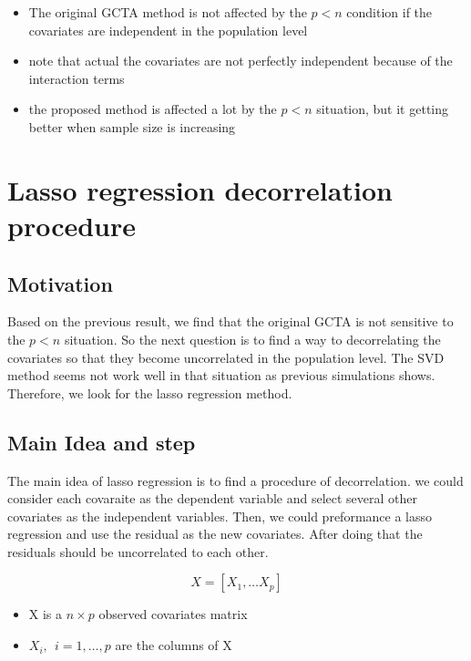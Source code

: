 \documentclass[]{article}
\providecommand{\tightlist}{%
  \setlength{\itemsep}{0pt}\setlength{\parskip}{0pt}}
\begin{document}
\begin{itemize}
\tightlist
\item
  The original GCTA method is not affected by the \(p < n\) condition if
  the covariates are independent in the population level
\item
  note that actual the covariates are not perfectly independent because
  of the interaction terms
\item
  the proposed method is affected a lot by the \(p <n\) situation, but
  it getting better when sample size is increasing
\end{itemize}

\section{Lasso regression decorrelation
procedure}\label{lasso-regression-decorrelation-procedure}

\subsection{Motivation}\label{motivation-1}

Based on the previous result, we find that the original GCTA is not
sensitive to the \(p < n\) situation. So the next question is to find a
way to decorrelating the covariates so that they become uncorrelated in
the population level. The SVD method seems not work well in that
situation as previous simulations shows. Therefore, we look for the
lasso regression method.

\subsection{Main Idea and step}\label{main-idea-and-step}

The main idea of lasso regression is to find a procedure of
decorrelation. we could consider each covaraite as the dependent
variable and select several other covariates as the independent
variables. Then, we could preformance a lasso regression and use the
residual as the new covariates. After doing that the residuals should be
uncorrelated to each other.

\[
  X = [X_1, \dots X_p]
\]

\begin{itemize}
\tightlist
\item
  X is a \(n \times p\) observed covariates matrix
\item
  \(X_i, ~~ i = 1, \dots, p\) are the columns of X
\end{itemize}
\end{document}
